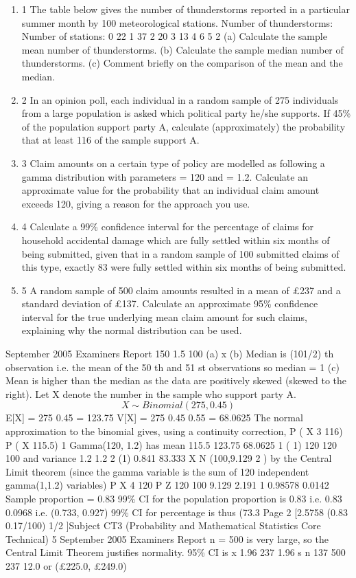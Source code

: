 \documentclass[a4paper,12pt]{article}
\begin{document}

\begin{enumerate}
\item 1
The table below gives the number of thunderstorms reported in a particular summer
month by 100 meteorological stations.
Number of thunderstorms:
Number of stations:
0
22
1
37
2
20
3
13
4
6
5
2
(a) Calculate the sample mean number of thunderstorms.
(b) Calculate the sample median number of thunderstorms.
(c) Comment briefly on the comparison of the mean and the median.
\item 
2 In an opinion poll, each individual in a random sample of 275 individuals from a large population is asked which political party he/she supports. If 45\% of the population
support party A, calculate (approximately) the probability that at least 116 of the sample support A.
\item 
3 Claim amounts on a certain type of policy are modelled as following a gamma distribution with parameters = 120 and = 1.2.
Calculate an approximate value for the probability that an individual claim amount exceeds 120, giving a reason for the approach you use.
\item 
4 Calculate a 99\% confidence interval for the percentage of claims for household accidental damage which are fully settled within six months of being submitted, given
that in a random sample of 100 submitted claims of this type, exactly 83 were fully settled within six months of being submitted.
\item 
5 A random sample of 500 claim amounts resulted in a mean of £237 and a standard deviation of £137.
Calculate an approximate 95\% confidence interval for the true underlying mean claim amount for such claims, explaining why the normal distribution can be used.

\end{enumerate}
September 2005
Examiners Report
150
1.5
100
(a) x
(b) Median is (101/2) th observation i.e. the mean of the 50 th and 51 st observations
so median = 1
(c) Mean is higher than the median as the data are positively skewed (skewed to
the right).
Let X denote the number in the sample who support party A.
\[X \sim Binomial(275, 0.45)\]
E[X] = 275 0.45 = 123.75
V[X] = 275 0.45 0.55 = 68.0625
The normal approximation to the binomial gives, using a continuity correction,
P ( X
3
116)
P ( X
115.5) 1
Gamma(120, 1.2) has mean
115.5 123.75
68.0625
1
( 1)
120
120
100 and variance
1.2
1.2 2
(1) 0.841
83.333
X N (100,9.129 2 ) by the Central Limit theorem (since the gamma variable is the
sum of 120 independent gamma(1,1.2) variables)
P X
4
120
P Z
120 100
9.129
2.191
1 0.98578 0.0142
Sample proportion = 0.83
99\% CI for the population proportion is 0.83
i.e. 0.83 0.0968 i.e. (0.733, 0.927)
99\% CI for percentage is thus (73.3%
Page 2
[2.5758
(0.83 0.17/100) 1/2 ]Subject CT3 (Probability and Mathematical Statistics Core Technical)
5
September 2005
Examiners Report
n = 500 is very large, so the Central Limit Theorem justifies normality.
95\% CI is x 1.96
237 1.96
s
n
137
500
237 12.0 or (£225.0, £249.0)
\end{document}
